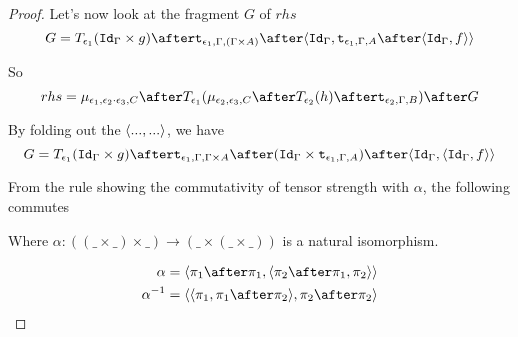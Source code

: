 \documentclass{report}
\begin{document}
\begin{framed}
\begin{proof}
        Let's now look at the fragment $G$ of $rhs$
        \begin{equation}
            G = \T{\e_1}{(\idg\times g)}\after\tstrength{\e_1}{\G}{(\G\times A)}\after\pr{\idg}{\tstrength{\e_1}{\G}{A}\after\pr{\idg}{f}}
        \end{equation}
        
        So
        \begin{equation}
            rhs = \bind{\e_1}{\e_2\dot\e_3}{C}\after\T{\e_1}{(\bind{\e_2}{\e_3}{C}\after \T{\e_2}{(h)} \after \tstrength{\e_2}{\G}{B})}\after G
        \end{equation}
        
        
        By folding out the $\langle..., ...\rangle$, we have
        \begin{equation}
            G = \T{\e_1}{(\idg\times g)}\after\tstrength{\e_1}{\G}{\G \times A}\after(\idg\times\tstrength{\e_1}{\G}{A})\after\pr{\idg}{\pr{\idg}{f}}
        \end{equation}
        
        From the rule  showing the commutativity of tensor strength with $\alpha$, the following commutes
        
        
        Where $\alpha: ((\_ \times \_) \times \_) \rightarrow (\_ \times (\_ \times \_))$ is a natural isomorphism.
        
        \begin{align*}
            \alpha & = \pr{\p\after\p}{\pr{\pp\after\p}{\pp}}\\
            \alpha^{-1} &= \pr{\pr{\p}{\p\after\pp}}{\pp\after\pp}
        \end{align*}
        

\end{proof}
\end{framed}
\end{document}
